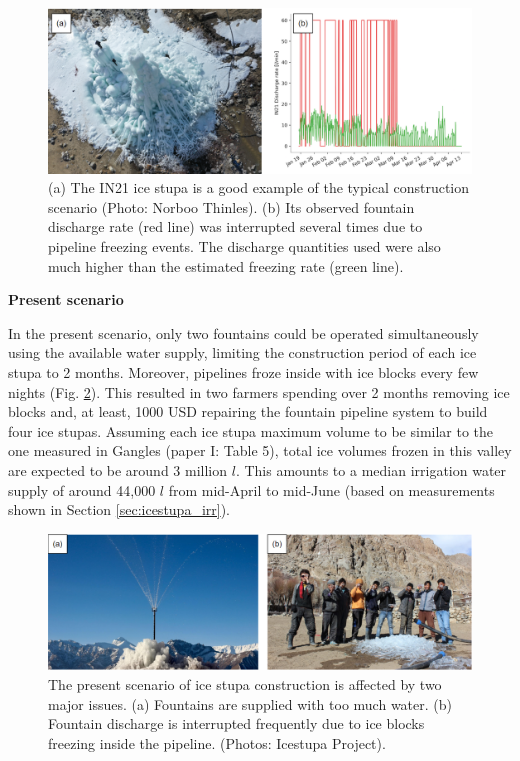 \begin{figure}[htb]
	\includegraphics[width=\textwidth]{figs/gangles_data}

  \caption{(a) The IN21 ice stupa is a good example of the typical construction scenario (Photo: Norboo
  Thinles). (b) Its observed fountain discharge rate (red line) was interrupted several times due to pipeline
freezing events. The discharge quantities used were also much higher than the estimated freezing rate (green
line). }

	\label{fig:gangles_data}
\end{figure}

\textbf{Present scenario}

In the present scenario, only two fountains could be operated simultaneously using the available water supply,
limiting the construction period of each ice stupa to 2 months. Moreover, pipelines froze inside with ice blocks
every few nights (Fig. \ref{fig:issues}). This resulted in two farmers spending over 2 months removing ice
blocks and, at least, 1000 USD repairing the fountain pipeline system to build four ice stupas. Assuming each
ice stupa maximum volume to be similar to the one measured in Gangles (paper I: Table 5), total ice volumes
frozen in this valley are expected to be around 3 million $l$. This amounts to a median irrigation water supply
of around 44,000 $l$ from mid-April to mid-June (based on measurements shown in Section \ref{sec:icestupa_irr}).

\begin{figure}[htb]
	\includegraphics[width=\textwidth]{figs/construction_issues}

  \caption{The present scenario of ice stupa construction is affected by two major issues. (a) Fountains are
  supplied with too much water. (b) Fountain discharge is interrupted frequently due to ice blocks freezing
  inside the pipeline. (Photos: Icestupa Project).}

	\label{fig:issues}
\end{figure}

